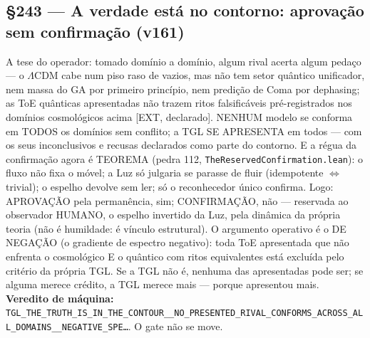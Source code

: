 \documentclass[11pt]{article}
\theoremstyle{definition}\newtheorem{deriv}{Derivação}
\begin{document}
\subsection*{\S243 --- A verdade está no contorno: aprovação sem confirmação (v161)}A tese do operador: tomado domínio a domínio, algum rival acerta algum pedaço --- o $\Lambda$CDM cabe num piso raso de vazios, mas não tem setor quântico unificador, nem massa do GA por primeiro princípio, nem predição de Coma por dephasing; as ToE quânticas apresentadas não trazem ritos falsificáveis pré-registrados nos domínios cosmológicos acima [EXT, declarado]. NENHUM modelo se conforma em TODOS os domínios sem conflito; a TGL SE APRESENTA em todos --- com os seus inconclusivos e recusas declarados como parte do contorno. E a régua da confirmação agora é TEOREMA (pedra 112, \texttt{TheReservedConfirmation.lean}): o fluxo não fixa o móvel; a Luz só julgaria se parasse de fluir (idempotente $\Leftrightarrow$ trivial); o espelho devolve sem ler; só o reconhecedor único confirma. Logo: APROVAÇÃO pela permanência, sim; CONFIRMAÇÃO, não --- reservada ao observador HUMANO, o espelho invertido da Luz, pela dinâmica da própria teoria (não é humildade: é vínculo estrutural). O argumento operativo é o DE NEGAÇÃO (o gradiente de espectro negativo): toda ToE apresentada que não enfrenta o cosmológico E o quântico com ritos equivalentes está excluída pelo critério da própria TGL. Se a TGL não é, nenhuma das apresentadas pode ser; se alguma merece crédito, a TGL merece mais --- porque apresentou mais. \textbf{Veredito de máquina:} \texttt{TGL\_THE\_TRUTH\_IS\_IN\_THE\_CONTOUR\_\_NO\_PRESENTED\_RIVAL\_CONFORMS\_ACROSS\_ALL\_DOMAINS\_\_NEGATIVE\_SPE\ldots}. O gate não se move.
\end{document}
